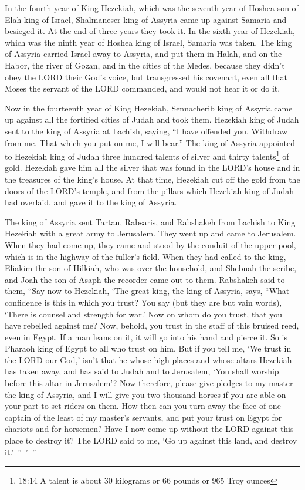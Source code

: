 \myverse{}In the fourth year of King Hezekiah, which was the seventh year
of Hoshea son of Elah king of Israel, Shalmaneser king of Assyria came up against Samaria and besieged
it.
\myverse{}At the end of three years they took it. In the sixth year of Hezekiah, which
was the ninth year of Hoshea king of Israel, Samaria was taken.
\myverse{}The king of Assyria carried Israel away to Assyria, and put them in Halah,
and on the Habor, the river of Gozan, and in the cities of the Medes,
\myverse{}because they didn’t obey the LORD their God’s voice, but transgressed his
covenant, even all that Moses the servant of the LORD commanded, and would not hear it or do it.

\myverse{}Now in the fourteenth year of King Hezekiah, Sennacherib king
of Assyria came up against all the fortified cities of Judah and took them.
\myverse{}Hezekiah king of Judah sent to the king of Assyria at Lachish, saying, “I
have offended you. Withdraw from me. That which you put on me, I will bear.” The king of Assyria appointed
to Hezekiah king of Judah three hundred talents of silver and thirty talents\footnote{18:14 A talent is about 30 kilograms or 66 pounds or 965 Troy ounces} of gold.
\myverse{}Hezekiah gave him all the silver that was found in the LORD’s house and in
the treasures of the king’s house.
\myverse{}At that time, Hezekiah cut off the gold from the doors of the LORD’s temple,
and from the pillars which Hezekiah king of Judah had overlaid, and gave it to the king of Assyria.

\myverse{}The king of Assyria sent Tartan, Rabsaris, and Rabshakeh from
Lachish to King Hezekiah with a great army to Jerusalem. They went up and came to Jerusalem. When they
had come up, they came and stood by the conduit of the upper pool, which is in the highway of the fuller’s
field.
\myverse{}When they had called to the king, Eliakim the son of Hilkiah, who was over
the household, and Shebnah the scribe, and Joah the son of Asaph the recorder came out to them.
\myverse{}Rabshakeh said to them, “Say now to Hezekiah, ‘The great king, the king of
Assyria, says, “What confidence is this in which you trust?
\myverse{}You say (but they are but vain words), ‘There is counsel and strength for
war.’ Now on whom do you trust, that you have rebelled against me?
\myverse{}Now, behold, you trust in the staff of this bruised reed, even in Egypt.
If a man leans on it, it will go into his hand and pierce it. So is Pharaoh king of Egypt to all who trust
on him.
\myverse{}But if you tell me, ‘We trust in the LORD our God,’ isn’t that he whose high
places and whose altars Hezekiah has taken away, and has said to Judah and to Jerusalem, ‘You shall worship
before this altar in Jerusalem’?
\myverse{}Now therefore, please give pledges to my master the king of Assyria, and
I will give you two thousand horses if you are able on your part to set riders on them.
\myverse{}How then can you turn away the face of one captain of the least of my master’s
servants, and put your trust on Egypt for chariots and for horsemen?
\myverse{}Have I now come up without the LORD against this place to destroy it? The
LORD said to me, ‘Go up against this land, and destroy it.’ ” ’ ”

